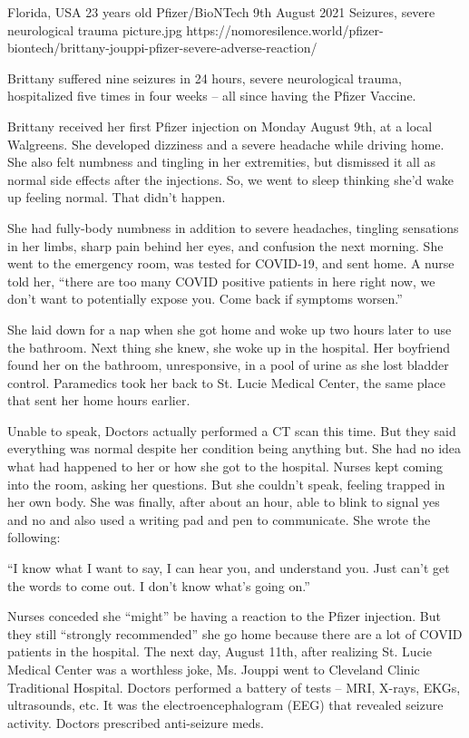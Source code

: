 {Florida, USA}
{23 years old}
{Pfizer/BioNTech}
{9th August 2021 }
{Seizures, severe neurological trauma}
{picture.jpg}
{https://nomoresilence.world/pfizer-biontech/brittany-jouppi-pfizer-severe-adverse-reaction/}
{

Brittany suffered nine seizures in 24 hours, severe neurological trauma,
hospitalized five times in four weeks – all since having the Pfizer Vaccine.

Brittany received her first Pfizer injection on Monday August 9th, at a local
Walgreens. She developed dizziness and a severe headache while driving home. She
also felt numbness and tingling in her extremities, but dismissed it all as
normal side effects after the injections. So, we went to sleep thinking she’d
wake up feeling normal. That didn’t happen.

She had fully-body numbness in addition to severe headaches, tingling sensations
in her limbs, sharp pain behind her eyes, and confusion the next morning. She
went to the emergency room, was tested for COVID-19, and sent home. A nurse told
her, “there are too many COVID positive patients in here right now, we don’t
want to potentially expose you. Come back if symptoms worsen.”

She laid down for a nap when she got home and woke up two hours later to use the
bathroom. Next thing she knew, she woke up in the hospital. Her boyfriend found
her on the bathroom, unresponsive, in a pool of urine as she lost bladder
control. Paramedics took her back to St. Lucie Medical Center, the same place
that sent her home hours earlier.

Unable to speak, Doctors actually performed a CT scan this time. But they said
everything was normal despite her condition being anything but. She had no idea
what had happened to her or how she got to the hospital. Nurses kept coming into
the room, asking her questions. But she couldn’t speak, feeling trapped in her
own body. She was finally, after about an hour, able to blink to signal yes and
no and also used a writing pad and pen to communicate. She wrote the following:

“I know what I want to say, I can hear you, and understand you. Just can’t get
the words to come out. I don’t know what’s going on.”

Nurses conceded she “might” be having a reaction to the Pfizer injection. But
they still “strongly recommended” she go home because there are a lot of COVID
patients in the hospital. The next day, August 11th, after realizing St. Lucie
Medical Center was a worthless joke, Ms. Jouppi went to Cleveland Clinic
Traditional Hospital. Doctors performed a battery of tests – MRI, X-rays, EKGs,
ultrasounds, etc. It was the electroencephalogram (EEG) that revealed seizure
activity. Doctors prescribed anti-seizure meds.

}
